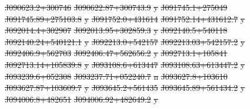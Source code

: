 \documentclass[11pt, a4paper]{book}
\providecommand{\DIFdeltex}[1]{{\protect\color{red}\sout{#1}}}                      %
\providecommand{\DIFdelFL}[1]{\DIFdel{#1}} %
\providecommand{\DIFdel}[1]{\texorpdfstring{\DIFdeltex{#1}}{}} %
\begin{document}
\DIFdelFL{J090623.2+300746 }%
\DIFdelFL{J090622.87+300743.9 }%
\DIFdelFL{y}%
\DIFdelFL{J091745.1+275049 }%
\DIFdelFL{J091745.89+275103.8 }%
\DIFdelFL{y}%
\DIFdelFL{J091752.0+431614 }%
\DIFdelFL{J091752.14+431612.7 }%
\DIFdelFL{y}%
\DIFdelFL{J092014.4+302907 }%
\DIFdelFL{J092013.95+302859.3 }%
\DIFdelFL{y}%
\DIFdelFL{J092140.5+540118 }%
\DIFdelFL{J092140.24+540121.1 }%
\DIFdelFL{y}%
\DIFdelFL{J092213.0+542157 }%
\DIFdelFL{J092213.03+542157.2 }%
\DIFdelFL{y}%
\DIFdelFL{J092406.9+562703 }%
\DIFdelFL{J092406.47+562656.2 }%
\DIFdelFL{y}%
\DIFdelFL{J092713.1+105841 }%
\DIFdelFL{J092713.14+105839.8 }%
\DIFdelFL{y}%
\DIFdelFL{J093108.6+613447 }%
\DIFdelFL{J093108.63+613447.2 }%
\DIFdelFL{y}%
\DIFdelFL{J093239.6+052308 }%
\DIFdelFL{J093237.71+052240.7 }%
\DIFdelFL{n}%
\DIFdelFL{J093627.8+103610 }%
\DIFdelFL{J093627.87+103609.7 }%
\DIFdelFL{y}%
\DIFdelFL{J093645.2+561435 }%
\DIFdelFL{J093645.89+561434.2 }%
\DIFdelFL{y}%
\DIFdelFL{J094006.8+482651 }%
\DIFdelFL{J094006.92+482649.2 }%
\DIFdelFL{y}%
\end{document}
